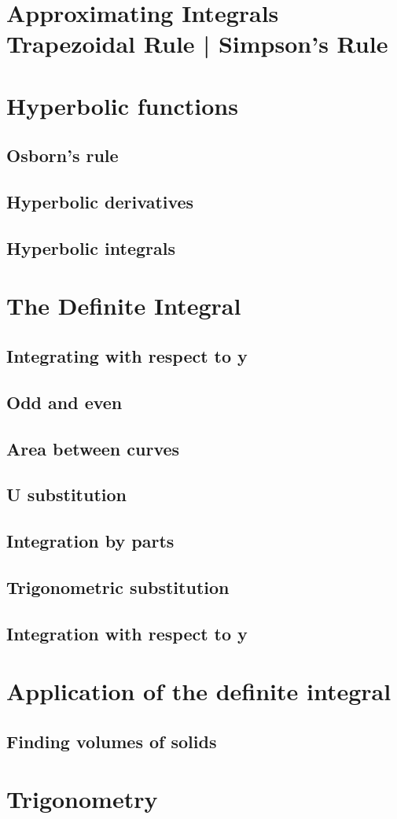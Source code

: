 \chapter{Approximating Integrals Trapezoidal Rule | Simpson's Rule}
\chapter{Hyperbolic functions}
\section{Osborn's rule}
\section{Hyperbolic derivatives}
\section{Hyperbolic integrals}


\chapter{The Definite Integral}

\section{Integrating with respect to y}

\section{Odd and even}
\section{Area between curves}
\section{U substitution}


\section{Integration by parts}
\section{Trigonometric substitution}

\section{Integration with respect to y}
\chapter{Application of the definite integral}
\section{Finding volumes of solids}
\chapter{Trigonometry}
